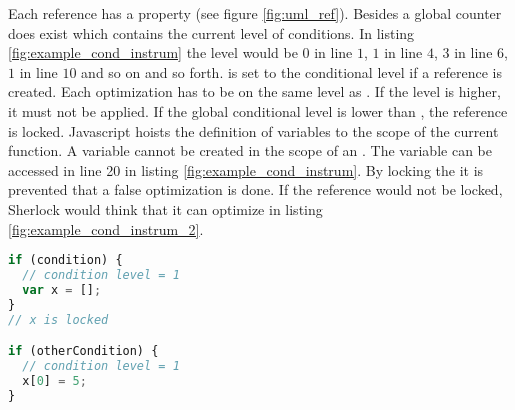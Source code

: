 Each reference has a  property (see figure \ref{fig:uml_ref}). Besides
 a global counter does exist which contains the current level of conditions. In 
 listing \ref{fig:example_cond_instrum} the level would be $0$ in line $1$, $1$ in 
 line $4$, $3$ in line $6$, $1$ in line $10$ and so on and so forth.  
 is set to the conditional level if a reference is created. Each optimization has 
 to be on the same level as . If the level is higher, it must not be 
 applied. If the global conditional level is lower than , the reference 
 is locked. Javascript hoists the definition of variables to the scope of the current 
 function. A variable cannot be created in the scope of an . The variable  
 can be accessed in line 20 in listing \ref{fig:example_cond_instrum}. By locking the
  it is prevented that a false optimization is done. If the reference 
 would not be locked, Sherlock would think that it can optimize  in listing
 \ref{fig:example_cond_instrum_2}.

\begin{lstlisting}[language=Javascript,caption={Example showing the use of condLevel property.},label=fig:example_cond_instrum_2]
if (condition) {
  // condition level = 1
  var x = [];
}
// x is locked

if (otherCondition) {
  // condition level = 1
  x[0] = 5;
}
\end{lstlisting}

\label{sssec:condition}




